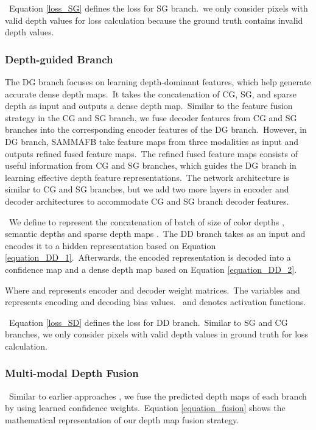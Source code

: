 \documentclass{ieeeaccess}
\begin{document}
~Equation \ref{loss_SG} defines the  loss for SG branch.~we only consider pixels with valid depth values for loss calculation because the ground truth contains invalid depth values.

\subsubsection{Depth-guided Branch}

The DG branch focuses on learning depth-dominant features, which help generate accurate dense depth maps.~It takes the concatenation of CG, SG, and sparse depth as input and outputs a dense depth map.~Similar to the feature fusion strategy in the CG and SG branch, we fuse decoder features from CG and SG branches into the corresponding encoder features of the DG branch.~However, in DG branch, SAMMAFB take feature maps from three modalities as input and outputs refined fused feature maps.~The refined fused feature maps consists of useful information from CG and SG branches, which guides the DG branch in learning effective depth feature representations.~The network architecture is similar to CG and SG branches, but we add two more layers in encoder and decoder architectures to accommodate CG and SG branch decoder features.




~We define  to represent the concatenation of batch of size  of color depths , semantic depths  and sparse depth maps .~The DD branch takes  as an input and encodes it to a hidden representation  based on Equation \ref{equation_DD_1}.~Afterwards, the encoded representation  is decoded into a confidence map  and a dense depth map  based on Equation \ref{equation_DD_2}. 



Where  and  represents encoder and decoder weight matrices.~The variables  and  represents encoding and decoding bias values.~ and  denotes activation functions.

~Equation \ref{loss_SD} defines the  loss for DD branch.~Similar to SG and CG branches, we only consider pixels with valid depth values in ground truth for loss calculation.


\subsubsection{Multi-modal Depth Fusion}
~Similar to earlier approaches \cite{hu2020PENet, vangansbeke2019sparse}, we fuse the predicted depth maps of each branch by using learned confidence weights.~Equation \ref{equation_fusion} shows the mathematical representation of our depth map fusion strategy.
 
\end{document}
